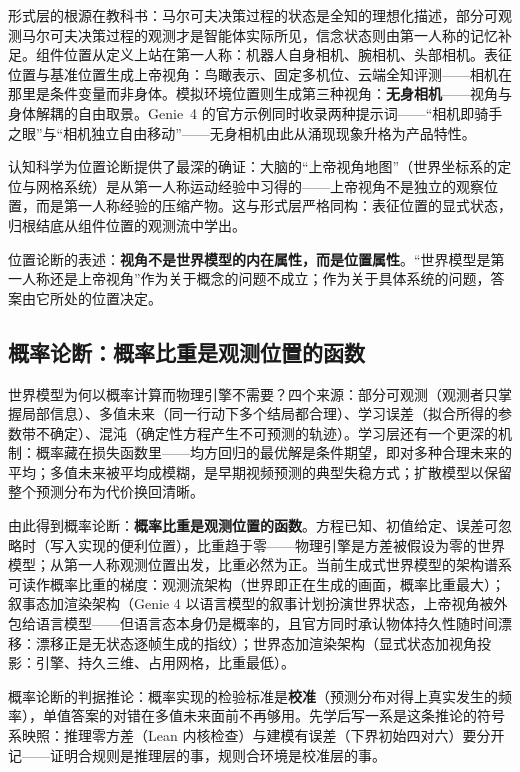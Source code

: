\documentclass[10pt,fontset=fandol]{ctexart}
\begin{document}
形式层的根源在教科书：马尔可夫决策过程的状态是全知的理想化描述，部分可观测马尔可夫决策过程的观测才是智能体实际所见，信念状态则由第一人称的记忆补足\cite{sutton2018rl,kaelbling1998pomdp}。组件位置从定义上站在第一人称：机器人自身相机、腕相机、头部相机\cite{meta2025vjepa2}。表征位置与基准位置生成上帝视角：鸟瞰表示、固定多机位、云端全知评测——相机在那里是条件变量而非身体\cite{wayve2025gaia2}。模拟环境位置则生成第三种视角：\textbf{无身相机}——视角与身体解耦的自由取景。Genie~4 的官方示例同时收录两种提示词——“相机即骑手之眼”与“相机独立自由移动”\cite{deepmind2026genie4}——无身相机由此从涌现现象升格为产品特性。

认知科学为位置论断提供了最深的确证：大脑的“上帝视角地图”（世界坐标系的定位与网格系统）是从第一人称运动经验中习得的\cite{tolman1948,okeefe1978}——上帝视角不是独立的观察位置，而是第一人称经验的压缩产物。这与形式层严格同构：表征位置的显式状态，归根结底从组件位置的观测流中学出。

位置论断的表述：\textbf{视角不是世界模型的内在属性，而是位置属性}。“世界模型是第一人称还是上帝视角”作为关于概念的问题不成立；作为关于具体系统的问题，答案由它所处的位置决定。

\subsection{概率论断：概率比重是观测位置的函数}\label{sec:probability}

世界模型为何以概率计算而物理引擎不需要？四个来源：部分可观测（观测者只掌握局部信息）、多值未来（同一行动下多个结局都合理）、学习误差（拟合所得的参数带不确定）、混沌（确定性方程产生不可预测的轨迹\cite{lorenz1963}）。学习层还有一个更深的机制：概率藏在损失函数里——均方回归的最优解是条件期望，即对多种合理未来的平均；多值未来被平均成模糊，是早期视频预测的典型失稳方式\cite{mathieu2016video}；扩散模型以保留整个预测分布为代价换回清晰\cite{ho2020ddpm}。

由此得到概率论断：\textbf{概率比重是观测位置的函数}。方程已知、初值给定、误差可忽略时（写入实现的便利位置），比重趋于零——物理引擎是方差被假设为零的世界模型；从第一人称观测位置出发，比重必然为正。当前生成式世界模型的架构谱系可读作概率比重的梯度：观测流架构（世界即正在生成的画面，概率比重最大）；叙事态加渲染架构（Genie 4 以语言模型的叙事计划扮演世界状态，上帝视角被外包给语言模型——但语言态本身仍是概率的，且官方同时承认物体持久性随时间漂移：漂移正是无状态逐帧生成的指纹\cite{deepmind2026genie4}）；世界态加渲染架构（显式状态加视角投影：引擎、持久三维、占用网格，比重最低）。

概率论断的判据推论：概率实现的检验标准是\textbf{校准}（预测分布对得上真实发生的频率），单值答案的对错在多值未来面前不再够用。先学后写一系是这条推论的符号系映照：推理零方差（Lean 内核检查）与建模有误差（下界初始四对六）要分开记——证明合规则是推理层的事，规则合环境是校准层的事。
\end{document}
